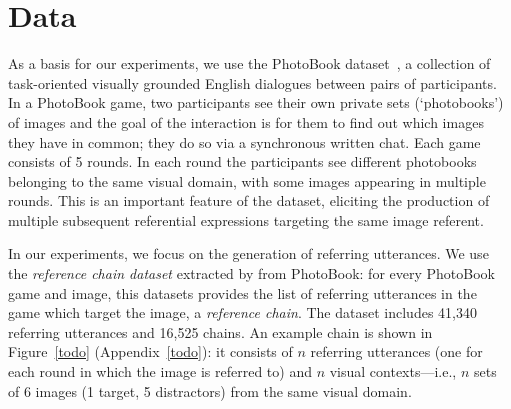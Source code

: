 
\section{Data}
\label{sec:data}


As a basis for our experiments, we use the PhotoBook dataset~\citep{haber2019photobook}, a collection of task-oriented visually grounded English dialogues between pairs of participants. In a PhotoBook game, two participants see their own private sets (`photobooks') of images and the goal of the interaction is for them to find out which images they have in common; they do so via a synchronous written chat. Each game consists of 5 rounds. In each round the participants see different photobooks belonging to the same visual domain, with some images appearing in multiple rounds. This is an important feature of the dataset, eliciting the production of multiple subsequent referential expressions targeting the same image referent. 

In our experiments, we focus on the generation of referring utterances.
We use the \textit{reference chain dataset} extracted by \citet{takmaz-etal-2020-refer} from PhotoBook: for every PhotoBook game and image, this datasets provides the list of referring utterances in the game which target the image, a \textit{reference chain}. The dataset includes 41,340 referring utterances and 16,525 chains.
An example chain is shown in Figure~\ref{todo} (Appendix~\ref{todo}): it consists of $n$ referring utterances (one for each round in which the image is referred to) and $n$ visual contexts---i.e., $n$ sets of 6 images (1 target, 5 distractors) from the same visual domain. 

